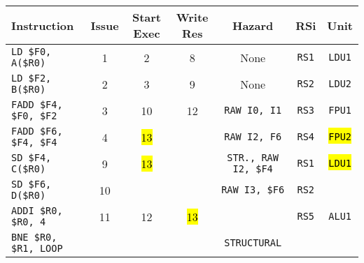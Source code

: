 \begin{enumerate}
    \begin{table}[!htp]
        \centering
        \begin{adjustbox}{width={\textwidth},totalheight={\textheight},keepaspectratio}
        \begin{tabular}{@{} l c c c c c c @{}}
            \toprule
            \textbf{Instruction} & \textbf{Issue} & \textbf{Start Exec} & \textbf{Write Res} & \textbf{Hazard} & \textbf{RSi} & \textbf{Unit} \\
            \midrule
            \texttt{LD \$F0, A(\$R0)}       & 1 & 2 & 8 & None  & \texttt{RS1}   & \texttt{LDU1}  \\ [.5em]
            \texttt{LD \$F2, B(\$R0)}       & 2 & 3 & 9 & None  & \texttt{RS2}   & \texttt{LDU2}  \\ [.5em]
            \texttt{FADD \$F4, \$F0, \$F2}  & 3 & 10 & 12 & \texttt{RAW I0, I1} & \texttt{RS3} & \texttt{FPU1} \\ [.5em]
            \texttt{FADD \$F6, \$F4, \$F4}  & 4 & \hl{13} &   & \texttt{RAW I2, F6} & \texttt{RS4} & \hl{\texttt{FPU2}} \\ [.5em]
            \texttt{SD \$F4, C(\$R0)}       & 9 & \hl{13} &   & \texttt{STR., RAW I2, \$F4} & \texttt{RS1} & \hl{\texttt{LDU1}} \\ [.5em]
            \texttt{SD \$F6, D(\$R0)}       & 10 &   &   & \texttt{RAW I3, \$F6} & \texttt{RS2} &       \\ [.5em]
            \texttt{ADDI \$R0, \$R0, 4}     & 11 & 12 & \hl{13} &       & \texttt{RS5} & \texttt{ALU1} \\ [.5em]
            \texttt{BNE \$R0, \$R1, LOOP}   &   &   &   & \texttt{STRUCTURAL} &       &       \\
            \bottomrule
        \end{tabular}
        \end{adjustbox}
    \end{table}
    

\end{enumerate}
